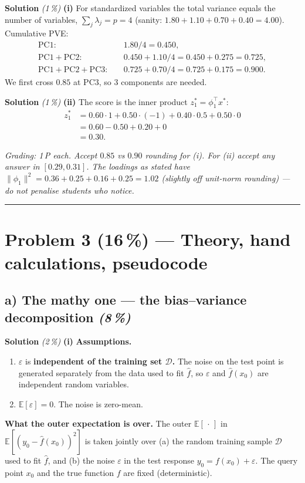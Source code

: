 \documentclass[11pt,a4paper]{article}
\newcommand{\points}[1]{\textbf{(#1\,\%)}}
\newcommand{\subpoints}[1]{\textit{(#1\,\%)}}
\newcommand{\sol}{\noindent\textbf{Solution}}
\begin{document}
\sol{} \subpoints{1} \textbf{(i)} For standardized variables the total variance equals the number
of variables, $\sum_j \lambda_j = p = 4$ (sanity: $1.80 + 1.10 + 0.70 + 0.40 = 4.00$). Cumulative
PVE:
\begin{align*}
\mathrm{PC1}: &\quad 1.80/4 = 0.450, \\
\mathrm{PC1\!+\!PC2}: &\quad 0.450 + 1.10/4 = 0.450 + 0.275 = 0.725, \\
\mathrm{PC1\!+\!PC2\!+\!PC3}: &\quad 0.725 + 0.70/4 = 0.725 + 0.175 = 0.900.
\end{align*}
We first cross $0.85$ at $\mathrm{PC3}$, so $\boxed{3}$ components are needed.

\medskip
\sol{} \subpoints{1} \textbf{(ii)} The score is the inner product $z^*_1 = \phi_1^\top x^*$:
\begin{align*}
z^*_1 &= 0.60\cdot 1 + 0.50\cdot(-1) + 0.40\cdot 0.5 + 0.50\cdot 0 \\
      &= 0.60 - 0.50 + 0.20 + 0 \\
      &= \boxed{0.30}.
\end{align*}

\noindent\emph{Grading: 1\,P each. Accept $0.85$ vs $0.90$ rounding for (i). For (ii) accept any
answer in $[0.29, 0.31]$. The loadings as stated have $\|\phi_1\|^2 = 0.36+0.25+0.16+0.25 = 1.02$
(slightly off unit-norm rounding) --- do not penalise students who notice.}

\vspace{0.6em}
\hrule
\vspace{1em}

\section*{Problem 3 \points{16} --- Theory, hand calculations, pseudocode}

\subsection*{a) The mathy one --- the bias--variance decomposition \subpoints{8}}

\sol{} \subpoints{2} \textbf{(i)} \textbf{Assumptions.}
\begin{enumerate}
  \item $\varepsilon$ is \textbf{independent of the training set $\mathcal D$.} The noise on the
        test point is generated separately from the data used to fit $\hat f$, so $\varepsilon$ and
        $\hat f(x_0)$ are independent random variables.
  \item $\mathbb E[\varepsilon] = 0$. The noise is zero-mean.
\end{enumerate}
\textbf{What the outer expectation is over.} The outer $\mathbb E[\,\cdot\,]$ in
$\mathbb E[(y_0 - \hat f(x_0))^2]$ is taken jointly over (a) the random training sample $\mathcal D$
used to fit $\hat f$, and (b) the noise $\varepsilon$ in the test response $y_0=f(x_0)+\varepsilon$.
The query point $x_0$ and the true function $f$ are fixed (deterministic).
\end{document}
